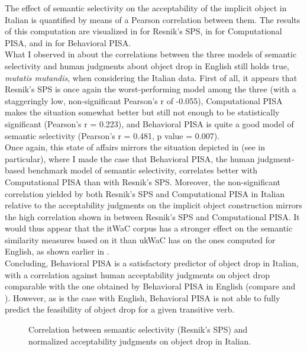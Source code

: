 The effect of semantic selectivity on the acceptability of the implicit object in Italian is quantified by means of a Pearson correlation between them. The results of this computation are visualized in  for Resnik's SPS, in  for Computational PISA, and in  for Behavioral PISA.\\
What I observed in  about the correlations between the three models of semantic selectivity and human judgments about object drop in English still holds true, \textit{mutatis mutandis}, when considering the Italian data. First of all, it appears that Resnik's SPS is once again the worst-performing model among the three (with a staggeringly low, non-significant Pearson's r of -0.055), Computational PISA makes the situation somewhat better but still not enough to be statistically significant (Pearson's r = 0.223), and Behavioral PISA is quite a good model of semantic selectivity (Pearson's r = 0.481, p value = 0.007).\\
Once again, this state of affairs mirrors the situation depicted in  (see  in particular), where I made the case that Behavioral PISA, the human judgment-based benchmark model of semantic selectivity, correlates better with Computational PISA than with Resnik's SPS. Moreover, the non-significant correlation yielded by both Resnik's SPS and Computational PISA in Italian relative to the acceptability judgments on the implicit object construction mirrors the high correlation shown in  between Resnik's SPS and Computational PISA. It would thus appear that the itWaC corpus has a stronger effect on the semantic similarity measures based on it than ukWaC has on the ones computed for English, as shown earlier in .\\
Concluding, Behavioral PISA is a satisfactory predictor of object drop in Italian, with a correlation against human acceptability judgments on object drop comparable with the one obtained by Behavioral PISA in English (compare  and ). However, as is the case with English, Behavioral PISA is not able to fully predict the feasibility of object drop for a given transitive verb.


\begin{figure}[htb]
\caption{Correlation between semantic selectivity (Resnik's SPS) and normalized acceptability judgments on object drop in Italian.}
    
\end{figure}

